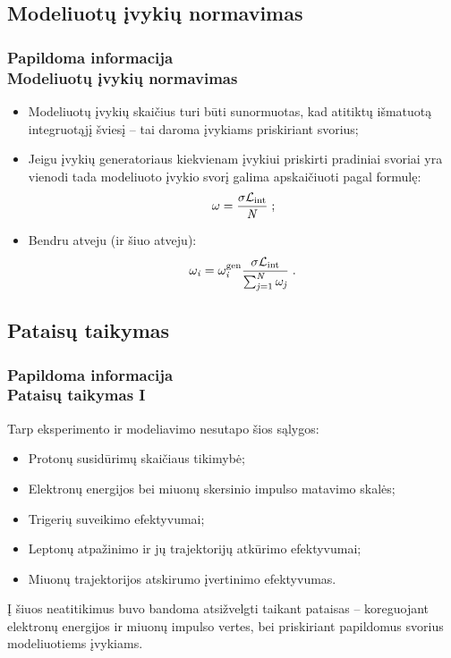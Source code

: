 \documentclass[xcolor=dvipsnames]{beamer}
\newcommand{\Lumi}{{\cal L}_\mathrm{int}}
\begin{document}
\begin{frame}
	\subsection{Modeliuotų įvykių normavimas}
	\frametitle{Papildoma informacija\\ \small Modeliuotų įvykių normavimas}
	\begin{itemize}
		\item Modeliuotų įvykių skaičius turi būti sunormuotas, kad atitiktų išmatuotą integruotąjį šviesį -- tai daroma įvykiams
		priskiriant svorius;
		\item Jeigu įvykių generatoriaus kiekvienam įvykiui priskirti pradiniai svoriai yra vienodi tada modeliuoto įvykio svorį
		galima apskaičiuoti pagal formulę:
		\begin{equation*}
			\omega = \frac{\sigma \Lumi}{\mathit{N}} \; ;
		\end{equation*}
		\item Bendru atveju (ir šiuo atveju):
		\begin{equation*}
			\omega_{\mathit{i}} = \omega_{\mathit{i}}^{\mathrm{gen}}
								  \frac{\sigma \Lumi}{\sum_{\mathit{j}=1}^{\mathit{N}}\omega_{\mathit{j}}} \; .
		\end{equation*}
	\end{itemize}
\end{frame}


\begin{frame}
	\subsection{Pataisų taikymas}
	\frametitle{Papildoma informacija\\ \small Pataisų taikymas I}
	Tarp eksperimento ir modeliavimo nesutapo šios sąlygos:
	\begin{itemize}
		\item Protonų susidūrimų skaičiaus tikimybė;
		\item Elektronų energijos bei miuonų skersinio impulso matavimo skalės;
		\item Trigerių suveikimo efektyvumai;
		\item Leptonų atpažinimo ir jų trajektorijų atkūrimo efektyvumai;
		\item Miuonų trajektorijos atskirumo įvertinimo efektyvumas.
	\end{itemize}
	Į šiuos neatitikimus buvo bandoma atsižvelgti taikant pataisas -- koreguojant elektronų energijos ir miuonų impulso vertes,
	bei priskiriant papildomus svorius modeliuotiems įvykiams.
\end{frame}
\end{document}
